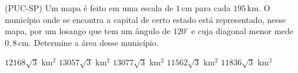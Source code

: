 \noindent\parbox{\linewidth}{

(PUC-SP) Um mapa é feito em uma escala de $1$\,cm para cada $195$\,km. O município onde se encontra a capital de certo estado está representado, nesse mapa, por um losango que tem um ângulo de $120^\circ$ e cuja diagonal menor mede $0{,}8$\,cm. Determine a área desse município.

$12168\sqrt{3}$ km$^2$
$13057\sqrt{3}$ km$^2$
$13077\sqrt{3}$ km$^2$
$11562\sqrt{3}$ km$^2$
$11836\sqrt{3}$ km$^2$



}


